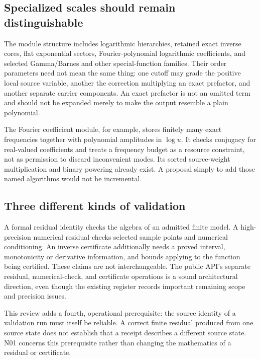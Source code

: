 \documentclass[11pt,a4paper]{article}
\begin{document}
\subsection{Specialized scales should remain distinguishable}

The module structure includes logarithmic hierarchies, retained exact inverse
cores, flat exponential sectors, Fourier-polynomial logarithmic coefficients,
and selected Gamma/Barnes and other special-function families. Their order
parameters need not mean the same thing: one cutoff may grade the positive
local source variable, another the correction multiplying an exact prefactor,
and another separate carrier components. An exact prefactor is not an omitted
term and should not be expanded merely to make the output resemble a plain
polynomial. \cite{modulemap,guide,lambert,fourier}

The Fourier coefficient module, for example, stores finitely many exact
frequencies together with polynomial amplitudes in $\log u$. It checks
conjugacy for real-valued coefficients and treats a frequency budget as a
resource constraint, not as permission to discard inconvenient modes. Its
sorted source-weight multiplication and binary powering already exist. A
proposal simply to add those named algorithms would not be incremental.
\cite{fourier,status}

\subsection{Three different kinds of validation}

A formal residual identity checks the algebra of an admitted finite model.
A high-precision numerical residual checks selected sample points and numerical
conditioning. An inverse certificate additionally needs a proved interval,
monotonicity or derivative information, and bounds applying to the function
being certified. These claims are not interchangeable. The public API's
separate residual, numerical-check, and certificate operations is a sound
architectural direction, even though the existing register records important
remaining scope and precision issues. \cite{guide,status}

This review adds a fourth, operational prerequisite: the source identity of a
validation run must itself be reliable. A correct finite residual produced from
one source state does not establish that a receipt describes a different
source state. N01 concerns this prerequisite rather than changing the
mathematics of a residual or certificate.
\end{document}

